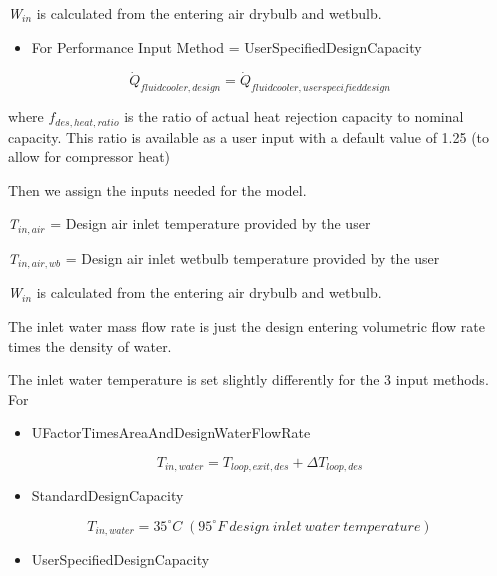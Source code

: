 \emph{W\(_{in}\)} is calculated from the entering air drybulb and wetbulb.

\begin{itemize}
\tightlist
\item
  For Performance Input Method = UserSpecifiedDesignCapacity
\end{itemize}

\begin{equation}
{\dot Q_{fluidcooler,design}} = {\dot Q_{fluidcooler,userspecifieddesign}}
\end{equation}

where \({f_{des,heat,ratio}}\) is the ratio of actual heat rejection capacity to nominal capacity. This ratio is available as a user input with a default value of 1.25 (to allow for compressor heat)

Then we assign the inputs needed for the model.

\emph{T\(_{in,air}\)} = Design air inlet temperature provided by the user

\emph{T\(_{in,air,wb}\)} = Design air inlet wetbulb temperature provided by the user

\emph{W\(_{in}\)} is calculated from the entering air drybulb and wetbulb.

The inlet water mass flow rate is just the design entering volumetric flow rate times the density of water.

The inlet water temperature is set slightly differently for the 3 input methods. For

\begin{itemize}
\tightlist
\item
  UFactorTimesAreaAndDesignWaterFlowRate
\end{itemize}

\begin{equation}
{T_{in,water}} = {T_{loop,exit,des}} + \Delta {T_{loop,des}}
\end{equation}

\begin{itemize}
\tightlist
\item
  StandardDesignCapacity
\end{itemize}

\begin{equation}
{T_{in,water}} = 35^\circ C\;(95^\circ F~design~inlet~water~temperature)
\end{equation}

\begin{itemize}
\tightlist
\item
  UserSpecifiedDesignCapacity
\end{itemize}

